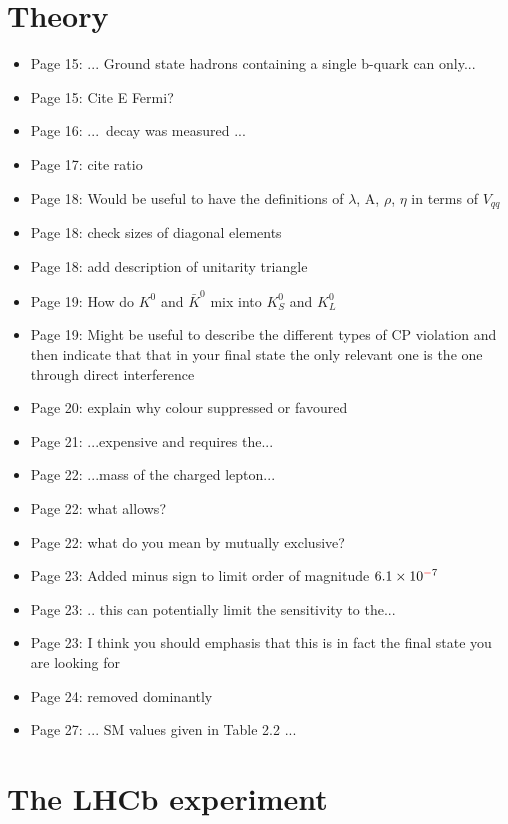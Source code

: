 \documentclass[12pt]{article}
\begin{document}
\section{Theory}
\begin{itemize}
\item Page 15: ... Ground state hadrons {\color{red}containing a single b-quark} can only...
\item Page 15: {\color{blue}Cite E Fermi?}
\item Page 16: ... decay {\color{red}was} measured ... 
\item Page 17: {\color{blue}cite ratio}
\item Page 18: {\color{blue}Would be useful to have the definitions of $\lambda$, A, $\rho$, $\eta$ in terms of $V_{qq}$}
\item Page 18: {\color{blue} check sizes of diagonal elements}
\item Page 18: {\color{blue} add description of unitarity triangle}
\item Page 19: {\color{blue} How do $K^{0}$ and $\bar{K}^{0}$ mix into $K_{S}^{0}$ and $K_{L}^{0}$}
\item Page 19: {\color{blue} Might be useful to describe the different types of CP violation and then indicate that that in your final state the only relevant one is the one through direct interference}
\item Page 20: {\color{blue} explain why colour suppressed or favoured}
\item Page 21: ...expensive {\color{red}and} requires the...
\item Page 22: ...mass {\color{red}of the} charged lepton...

\item Page 22: {\color{blue} what allows?}
\item Page 22: {\color{blue} what do you mean by mutually exclusive?}
\item Page 23: Added minus sign to limit order of magnitude $6.1\times10^{{\color{red}-}7}$
\item Page 23: .. this can {\color{red}potentially} limit the sensitivity {\color{red}to} the...
\item Page 23: {\color{blue}I think you should emphasis that this is in fact the final state you are looking for}
\item Page 24: removed {\color{red}dominantly}
\item Page 27: ... SM values given {\color{red}in Table 2.2} ...
\end{itemize}
\section{The LHCb experiment}
\end{document}
